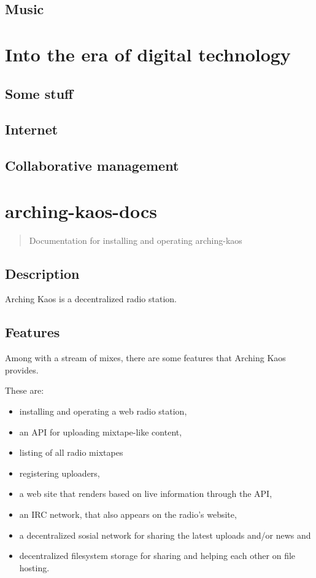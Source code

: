 \documentclass[12pt]{report}
\begin{document}
\section{Music}

\chapter{Into the era of digital technology}
\section{Some stuff}
\section{Internet}
\section{Collaborative management}


\chapter{arching-kaos-docs}\label{arching-kaos-docs}

\begin{quote}
Documentation for installing and operating arching-kaos
\end{quote}

\section{Description}\label{description}

Arching Kaos is a decentralized radio station.

\section{Features}\label{features}

Among with a stream of mixes, there are some features that Arching Kaos
provides.

These are: 
\begin{itemize}
\item installing and operating a web radio station,
\item an API for uploading mixtape-like content,
\item listing of all radio mixtapes
\item registering uploaders,
\item a web site that renders based on live information through the API,
\item an IRC network, that also appears on the radio's website,
\item a decentralized sosial network for sharing the latest uploads and/or news and
\item decentralized filesystem storage for sharing and helping each other on file hosting.
\end{itemize}
\end{document}
